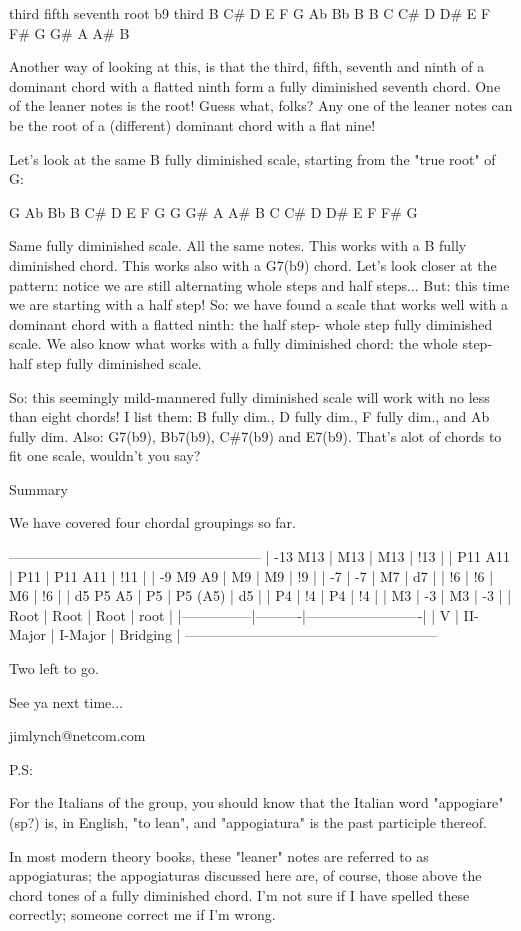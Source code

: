 third        fifth         seventh    root   b9           third
B         C\#   D         E    F         G    Ab        Bb   B
B    C    C\#   D    D\#   E    F    F\#   G    G\#   A    A\#   B

Another way of looking at this, is that the third, fifth, seventh and ninth
of a dominant chord with a flatted ninth form a fully diminished seventh
chord. One of the leaner notes is the root! Guess what, folks? Any one of the
leaner notes can be the root of a (different) dominant chord with a flat nine!

Let's look at the same B fully diminished scale, starting from the "true root"
of G:

G    Ab        Bb   B         C\#   D         E    F         G
G    G\#   A    A\#   B    C    C\#   D    D\#   E    F    F\#   G

Same fully diminished scale. All the same notes. This works with a B fully
diminished chord. This works also with a G7(b9) chord. Let's look closer at
the pattern: notice we are still alternating whole steps and half steps...
But: this time we are starting with a half step! So: we have found a scale
that works well with a dominant chord with a flatted ninth: the half step-
whole step fully diminished scale. We also know what works with a fully
diminished chord: the whole step-half step fully diminished scale.

So: this seemingly mild-mannered fully diminished scale will work with no less
than eight chords! I list them: B fully dim., D fully dim., F fully dim., and
Ab fully dim. Also: G7(b9), Bb7(b9), C\#7(b9) and E7(b9). That's alot of chords
to fit one scale, wouldn't you say?

Summary

We have covered four chordal groupings so far.

------------------------------------------------------
| -13  M13      |   M13    |  M13       |    !13     |
|      P11  A11 |   P11    |  P11  A11  |    !11     |
|  -9   M9   A9 |    M9    |   M9       |     !9     |
|       -7      |    -7    |   M7       |     d7     |
|       !6      |    !6    |   M6       |     !6     |
|  d5   P5   A5 |    P5    |   P5 (A5)  |     d5     |
|       P4      |    !4    |   P4       |     !4     |
|       M3      |    -3    |   M3       |     -3     |
|      Root     |   Root   |  Root      |    root    |
|---------------|----------|-------------------------|
|        V      | II-Major | I-Major    |  Bridging  |
------------------------------------------------------

Two left to go.

See ya next time...

jimlynch@netcom.com

P.S:

For the Italians of the group, you should know that the
Italian word "appogiare" (sp?) is, in English, "to lean",
and "appogiatura" is the past participle thereof.

In most modern theory books, these "leaner" notes are
referred to as appogiaturas; the appogiaturas discussed
here are, of course, those above the chord tones of a
fully diminished chord. I'm not sure if I have spelled
these correctly; someone correct me if I'm wrong.

